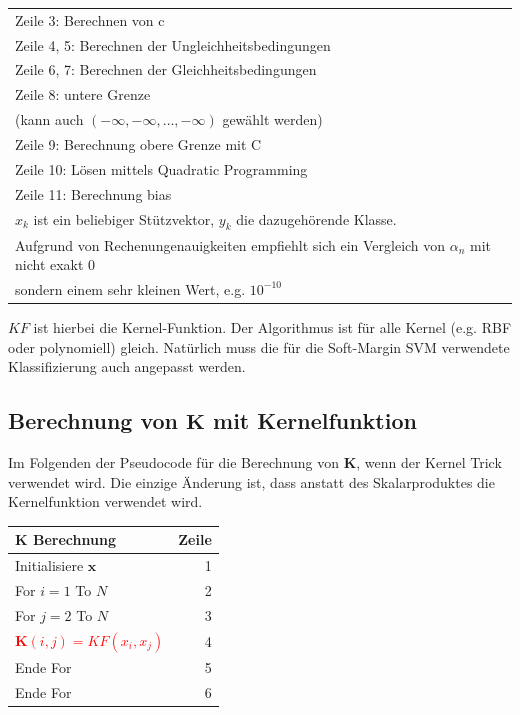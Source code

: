 \documentclass[a4paper,11pt,twoside]{scrreprt}
\begin{document}
\begin{table}[H]
\begin{tabular}{|l|}
    Zeile 3: Berechnen von c \\
    Zeile 4, 5: Berechnen der Ungleichheitsbedingungen\\
    Zeile 6, 7: Berechnen der Gleichheitsbedingungen\\
    Zeile 8: untere Grenze \\
    (kann auch $\left( -\infty, -\infty, \ldots, -\infty \right)$ gewählt werden) \\
    Zeile 9: Berechnung obere Grenze mit C \\
    Zeile 10: Lösen mittels Quadratic Programming \\
    Zeile 11: Berechnung bias \\
    $x_{k}$ ist ein beliebiger Stützvektor, $y_{k}$ die dazugehörende Klasse. \\
    Aufgrund von Rechenungenauigkeiten empfiehlt sich ein Vergleich von $\alpha_{n}$ mit nicht exakt $0$ \\
    sondern einem sehr kleinen Wert, e.g. $10^{-10}$ \\
    \hline
\end{tabular}
\end{table}
$KF$ ist hierbei die Kernel-Funktion.
Der Algorithmus ist für alle Kernel (e.g. RBF oder polynomiell) gleich.
Natürlich muss die für die Soft-Margin SVM verwendete Klassifizierung auch angepasst werden.

\subsection{Berechnung von $\mathbf{K}$ mit Kernelfunktion}\label{subsec:kberkern}
Im Folgenden der Pseudocode für die Berechnung von $\mathbf{K}$, wenn der Kernel Trick verwendet wird.
Die einzige Änderung ist, dass anstatt des Skalarproduktes die Kernelfunktion verwendet wird.
\begin{table}[H]\label{tab:kkernel}
    \begin{tabular}{|l r|}
        \hline
        $\mathbf{K}$ \textbf{Berechnung} & \textbf{Zeile} \\
        \hline
        Initialisiere $\mathbf{x}$ & 1 \\
        For $i=1$ To $N$ & 2 \\
        \quad For $j=2$ To $N$ & 3 \\
        \textcolor{red}{\quad\quad $\mathbf{K}\left( i, j \right) = KF\left( x_{i}, x_{j} \right)$} & 4 \\
        \quad Ende For & 5 \\
        Ende For & 6 \\
        \hline
    \end{tabular}
\end{table}
\end{document}
